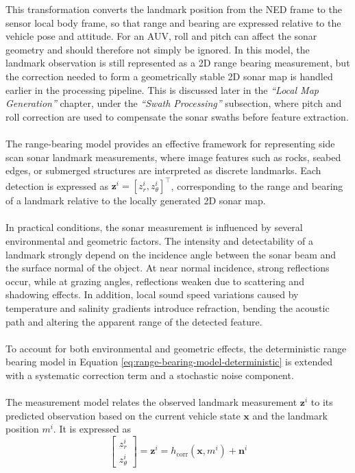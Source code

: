 This transformation converts the landmark position from the NED frame to the sensor local body frame, so that range and bearing are expressed relative to the vehicle pose and attitude. For an AUV, roll and pitch can affect the sonar geometry and should therefore not simply be ignored. In this model, the landmark observation is still represented as a 2D range bearing measurement, but the correction needed to form a geometrically stable 2D sonar map is handled earlier in the processing pipeline. This is discussed later in the \textit{``Local Map Generation''} chapter, under the \textit{``Swath Processing''} subsection, where pitch and roll correction are used to compensate the sonar swaths before feature extraction.
\\ \\
The range-bearing model provides an effective framework for representing side scan sonar landmark measurements, where image features such as rocks, seabed edges, or submerged structures are interpreted as discrete landmarks. Each detection is expressed as $\mathbf{z}^i = [z_r^i, z_\theta^i]^\top$, corresponding to the range and bearing of a landmark relative to the locally generated 2D sonar map.  
\\ \\
In practical conditions, the sonar measurement is influenced by several environmental and geometric factors. The intensity and detectability of a landmark strongly depend on the incidence angle between the sonar beam and the surface normal of the object. At near normal incidence, strong reflections occur, while at grazing angles, reflections weaken due to scattering and shadowing effects. In addition, local sound speed variations caused by temperature and salinity gradients introduce refraction, bending the acoustic path and altering the apparent range of the detected feature.
\\ \\
To account for both environmental and geometric effects, the deterministic range bearing model in Equation \eqref{eq:range-bearing-model-deterministic} is extended with a systematic correction term and a stochastic noise component.  
\\ \\
The measurement model relates the observed landmark measurement $\mathbf{z}^i$ to its predicted observation based on the current vehicle state $\mathbf{x}$ and the landmark position $m^i$. It is expressed as
\begin{equation}
    \begin{bmatrix}
        z_r^i \\
        z_\theta^i
    \end{bmatrix} = 
    \mathbf{z}^i = h_{\text{corr}}(\mathbf{x}, m^i) + \mathbf{n}^i
    \label{eq:range-bearing-measurement-model}
\end{equation}
